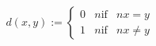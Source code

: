 \documentclass[preview]{standalone}
\begin{document}
\begin{align*}
d(x,y) := \begin{cases} 0 &n \text{if} &n x=y \\1 &n \text{if} &n x \neq y\end{cases}
\end{align*}
\end{document}
